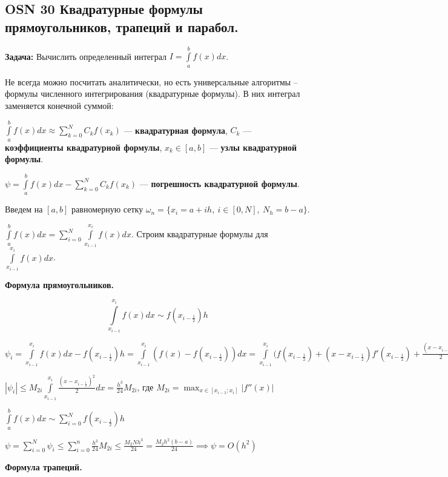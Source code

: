 \subsection{OSN 30 Квадратурные формулы прямоугольников, трапеций и парабол.}

\textbf{Задача:} Вычислить определенный интеграл $I = \int\limits_a^b f(x)dx$.

Не всегда можно посчитать аналитически, но есть универсальные алгоритмы -- формулы численного интегрирования (квадратурные формулы). 
В них интеграл заменяется конечной суммой:

$ \int\limits_a^b f(x)dx \approx\displaystyle\sum_{k=0}^N C_k f(x_k)$ --- \textbf{квадратурная формула}, 
$C_k$ --- \textbf{коэффициенты квадратурной формулы}, 
$x_k \in [a, b]$ --- \textbf{узлы квадратурной формулы}.

$\psi = \int\limits_a^b f(x)dx - \sum_{k=0}^N C_k f(x_k) $ --- \textbf{погрешность квадратурной формулы}. 

Введем на $[a,b]$ равномерную сетку $\omega_n = \{x_i =a+ih,~i\in[0,N],~N_h=b-a \}$.

$\int\limits_a^b f(x)dx = \displaystyle\sum_{i=0}^N\int\limits_{x_{i-1}}^{x_i} f(x)dx$. Строим квадратурные формулы для $\int\limits_{x_{i-1}}^{x_i} f(x)dx$.

\textbf{Формула прямоугольников.}

$$ \int\limits_{x_{i-1}}^{x_i} f(x)dx \sim f \left( x_{i-\frac{1}{2}} \right) h $$

$\psi_i = \int\limits_{x_{i-1}}^{x_i} f(x)dx - f \left( x_{i-\frac{1}{2}} \right)h = 
\int\limits_{x_{i-1}}^{x_i} \left( f(x) - f\left(x_{i-\frac{1}{2}} \right) \right)dx = 
\int\limits_{x_{i-1}}^{x_i} 
\Biggl( 
    f(x_{i-\frac{1}{2}}) + 
    (x - x_{i-\frac{1}{2}})f'(x_{i-\frac{1}{2}}) + 
    \frac{\left(x - x_{i-\frac{1}{2}}\right)^2}{2}f''(\xi) 
    \Biggr|_{\xi \in [x_{i-1};x_i]} - 
    f(x_{i-\frac{1}{2}}) 
\Biggr) dx$

$|\psi_i| \leqslant 
M_{2i} \int\limits_{x_{i-1}}^{x_i} \frac{ \left(x - x_{i-\frac{1}{2}} \right)^2}{2}dx = 
\frac{h^3}{24} M_{2i}$, где $ M_{2i} = \displaystyle\max_{x\in[x_{i-1};x_i]}|f''(x)|$

$\int\limits_a^b f(x)dx \sim \displaystyle\sum_{i=0}^N f(x_{i-\frac{1}{2}})h$

$\psi = \displaystyle\sum_{i=0}^N \psi_i \leqslant \displaystyle\sum_{i=0}^n \frac{h^3}{24} M_{2i}\leqslant \frac{M_2Nh^3}{24} = \frac{M_2h^2(b-a)}{24} \implies \psi = O(h^2)$

\textbf{Формула трапеций.}

